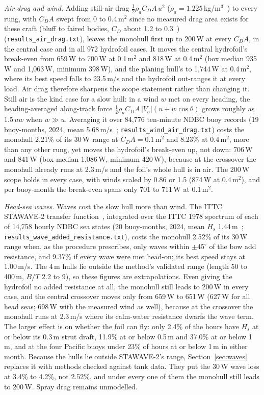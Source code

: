 \documentclass[conference]{IEEEtran}
\begin{document}
\emph{Air drag and wind.} Adding still-air drag $\tfrac12\rho_a C_DA\,u^2$ ($\rho_a=1.225$\,kg/m$^3$~\cite{iso2533}) to every rung, with
$C_DA$ swept from 0 to 0.4\,m$^2$ since no measured drag area exists for these craft (bluff to faired bodies, $C_D$ about 1.2 to 0.3~\cite{hoerner1965})
(\texttt{results\_air\_drag.txt}), leaves the monohull first up to 200\,W at every $C_DA$, in the
central case and in all 972 hydrofoil cases. It moves the central hydrofoil's break-even from 659\,W
to 700\,W at 0.1\,m$^2$ and 818\,W at 0.4\,m$^2$ (box median 935\,W and 1{,}063\,W, minimum 398\,W),
and the planing hull's to 1{,}744\,W at 0.4\,m$^2$, where its best speed falls to 23.5\,m/s and the
hydrofoil out-ranges it at every load. Air drag therefore sharpens the scope statement rather than
changing it. Still air is the kind case for a slow hull: in a wind $w$ met on every heading, the
heading-averaged along-track force $\tfrac12\rho_a C_DA\,\overline{|V_a|(u+w\cos\theta)}$ grows roughly as
$1.5\,uw$ when $w\gg u$. Averaging it over 84{,}776 ten-minute NDBC buoy records (19 buoy-months, 2024,
mean 5.68\,m/s~\cite{ndbc2024}; \texttt{results\_wind\_air\_drag.txt}) costs the monohull 2.21\% of its
30\,W range at $C_DA=0.1$\,m$^2$ and 8.23\% at 0.4\,m$^2$, more than any other rung, yet moves the
hydrofoil's break-even up, not down: 706\,W and 841\,W (box median 1{,}086\,W, minimum 420\,W), because at
the crossover the monohull already runs at 2.3\,m/s and the foil's whole hull is in air. The
200\,W scope holds in every case, with winds scaled by 0.86 or 1.5 (874\,W at 0.4\,m$^2$), and
per buoy-month the break-even spans only 701 to 711\,W at 0.1\,m$^2$.

\emph{Head-sea waves.} Waves cost the slow hull more
than wind. The ITTC STAWAVE-2 transfer function~\cite{ittc2021trials}, integrated over the ITTC 1978
spectrum of each of 14{,}758 hourly NDBC sea states (20 buoy-months, 2024, mean $H_s$ 1.44\,m~\cite{ndbc2024};
\texttt{results\_wave\_added\_resistance.txt}), costs the monohull 2.52\% of its 30\,W range when, as the
procedure prescribes, only waves within $\pm45^\circ$ of the bow add resistance, and 9.37\% if every wave
were met head-on; its best speed stays at 1.00\,m/s. The 4\,m hulls lie outside the method's validated
range (length 50 to 400\,m, $B/T$ 2.2 to 9), so these figures are extrapolations. Even giving the hydrofoil
no added resistance at all, the monohull still leads to 200\,W in every case, and the central crossover
moves only from 659\,W to 651\,W (627\,W for all head seas; 698\,W with the measured wind as well), because
at the crossover the monohull runs at 2.3\,m/s where its calm-water resistance dwarfs the wave term. The
larger effect is on whether the foil can fly: only 2.4\% of the hours have $H_s$ at or below its 0.3\,m
strut draft, 11.9\% at or below 0.5\,m and 37.0\% at or below 1\,m, and at the four Pacific buoys
under 23\% of hours at or below 1\,m in either month. Because the hulls lie outside STAWAVE-2's range, Section~\ref{sec:waves} replaces it with methods checked against tank data. They put the 30\,W wave loss at 3.4\% to 4.2\%, not 2.52\%, and under every one of them the monohull still leads to 200\,W. Spray drag remains unmodelled.
\end{document}
